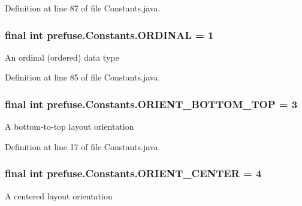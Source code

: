 \-Definition at line 87 of file \-Constants.\-java.

\hypertarget{interfaceprefuse_1_1_constants_a3cf3a628869c14a52340c5680992f605}{
\subsubsection[{\-O\-R\-D\-I\-N\-A\-L}]{\setlength{\rightskip}{0pt plus 5cm}final int {\bf prefuse.\-Constants.\-O\-R\-D\-I\-N\-A\-L} = 1}}\label{interfaceprefuse_1_1_constants_a3cf3a628869c14a52340c5680992f605}
\-An ordinal (ordered) data type 

\-Definition at line 85 of file \-Constants.\-java.

\hypertarget{interfaceprefuse_1_1_constants_a53792269bceb71a4965cd4c3db2d0ac1}{
\subsubsection[{\-O\-R\-I\-E\-N\-T\-\_\-\-B\-O\-T\-T\-O\-M\-\_\-\-T\-O\-P}]{\setlength{\rightskip}{0pt plus 5cm}final int {\bf prefuse.\-Constants.\-O\-R\-I\-E\-N\-T\-\_\-\-B\-O\-T\-T\-O\-M\-\_\-\-T\-O\-P} = 3}}\label{interfaceprefuse_1_1_constants_a53792269bceb71a4965cd4c3db2d0ac1}
\-A bottom-\/to-\/top layout orientation 

\-Definition at line 17 of file \-Constants.\-java.

\hypertarget{interfaceprefuse_1_1_constants_a755b061ca5c26c4fff53f624649d09f4}{
\subsubsection[{\-O\-R\-I\-E\-N\-T\-\_\-\-C\-E\-N\-T\-E\-R}]{\setlength{\rightskip}{0pt plus 5cm}final int {\bf prefuse.\-Constants.\-O\-R\-I\-E\-N\-T\-\_\-\-C\-E\-N\-T\-E\-R} = 4}}\label{interfaceprefuse_1_1_constants_a755b061ca5c26c4fff53f624649d09f4}
\-A centered layout orientation 

